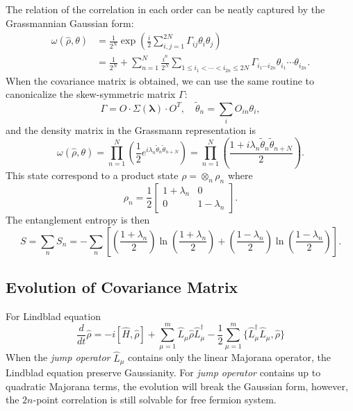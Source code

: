 \documentclass[aps,prb,superscriptaddress,nofootinbib]{revtex4}
\begin{document}
The relation of the correlation in each order can be neatly captured by the Grassmannian Gaussian form:
\begin{equation}
\begin{aligned}
	\omega(\hat \rho, \theta) 
	&= \frac{1}{2^N} \exp \left(\frac{i}{2} \sum_{i,j=1}^{2N}\Gamma_{ij}\theta_i \theta_j \right) \\
	&=\frac{1}{2^N} + \sum_{n=1}^{N}\frac{i^n}{2^N}\sum_{1\le i_{1}<\cdots<i_{2n} \le 2N}\Gamma_{i_{1}\cdots i_{2n}} \theta_{i_1} \cdots \theta_{i_{2n}}.
\end{aligned}
\end{equation}
When the covariance matrix is obtained, we can use the same routine to canonicalize the skew-symmetric matrix $\Gamma$:
\begin{equation*}
	\Gamma = O \cdot \Sigma(\bm \lambda) \cdot O^T, \quad
	\tilde\theta_n = \sum_i O_{in} \theta_i,
\end{equation*}
and the density matrix in the Grassmann representation is
\begin{equation}
	\omega(\hat \rho, \theta) 
	= \prod_{n=1}^N \left(\frac{1}{2} e^{i \lambda_n \tilde\theta_n \tilde\theta_{n+N}} \right)
	= \prod_{n=1}^N \left(\frac{1+i\lambda_n \tilde\theta_n\tilde\theta_{n+N}}{2}  \right).
\end{equation}
This state correspond to a product state $\rho = \otimes_n \rho_n$ where
\begin{equation}
	\rho_n = \frac{1}{2} \left[\begin{array}{cc}
		1 + \lambda_n & 0 \\
		0 & 1 - \lambda_n
	\end{array} \right].
\end{equation}
The entanglement entropy is then
\begin{equation}
	S=\sum_n S_n = -\sum_n \left[
	\left(\frac{1+\lambda_n}{2}\right)\ln\left(\frac{1+\lambda_n}{2}\right)
	+ \left(\frac{1-\lambda_n}{2}\right)\ln\left(\frac{1-\lambda_n}{2}\right)\right].
\end{equation}




\subsection{Evolution of Covariance Matrix}
For Lindblad equation
\begin{equation}
	\frac{d}{dt} \hat\rho = -i[\hat H, \hat \rho] + \sum_{\mu=1}^{m} \hat L_\mu \hat\rho \hat L_\mu^\dagger -\frac{1}{2} \sum_{\mu=1}^{m} \{\hat L_\mu^\dagger \hat L_\mu, \hat \rho\}
\end{equation}
When the \textit{jump operator} $\hat L_\mu$ contains only the linear Majorana operator, the Lindblad equation preserve Gaussianity. 
For \textit{jump operator} contains up to quadratic Majorana terms, the evolution will break the Gaussian form, however, the $2n$-point correlation is still solvable for free fermion system.
\end{document}
